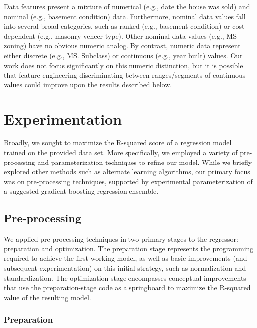 \documentclass[letterpaper]{article}
\begin{document}
Data features present a mixture of numerical (e.g., date the house was sold) and nominal (e.g., basement condition) data.  Furthermore, nominal data values fall into several broad categories, such as ranked (e.g., basement condition) or cost-dependent (e.g., masonry veneer type).  Other nominal data values (e.g., MS zoning) have no obvious numeric analog.  By contrast, numeric data represent either discrete (e.g., MS. Subclass) or continuous (e.g., year built) values.  Our work does not focus significantly on this numeric distinction, but it is possible that feature engineering discriminating between ranges/segments of continuous values could improve upon the results described below.

\section{Experimentation}

Broadly, we sought to maximize the R-squared score of a regression model trained on the provided data set.  More specifically, we employed a variety of pre-processing and parameterization techniques to refine our model.  While we briefly explored other methods such as alternate learning algorithms, our primary focus was on pre-processing techniques, supported by experimental parameterization of a suggested gradient boosting regression ensemble.

\subsection{Pre-processing}

We applied pre-processing techniques in two primary stages to the regressor: preparation and optimization.  The preparation stage represents the programming required to achieve the first working model, as well as basic improvements (and subsequent experimentation) on this initial strategy, such as normalization and standardization.  The optimization stage encompasses conceptual improvements that use the preparation-stage code as a springboard to maximize the R-squared value of the resulting model.

\subsubsection{Preparation}
\end{document}
